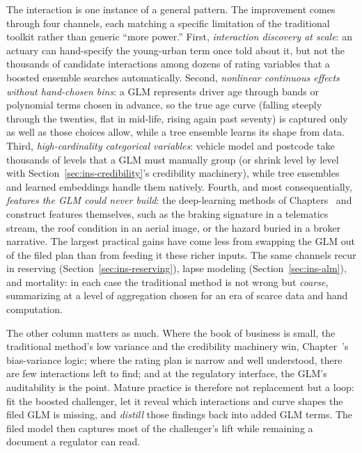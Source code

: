 \documentclass[../ai_in_finance]{subfiles}
\begin{document}
The interaction is one instance of a general pattern. The improvement comes through four channels, each matching a specific limitation of the traditional toolkit rather than generic ``more power.'' First, \emph{interaction discovery at scale}: an actuary can hand-specify the young-urban term once told about it, but not the thousands of candidate interactions among dozens of rating variables that a boosted ensemble searches automatically. Second, \emph{nonlinear continuous effects without hand-chosen bins}: a GLM represents driver age through bands or polynomial terms chosen in advance, so the true age curve (falling steeply through the twenties, flat in mid-life, rising again past seventy) is captured only as well as those choices allow, while a tree ensemble learns its shape from data. Third, \emph{high-cardinality categorical variables}: vehicle model and postcode take thousands of levels that a GLM must manually group (or shrink level by level with Section~\ref{sec:ins-credibility}'s credibility machinery), while tree ensembles and learned embeddings handle them natively. Fourth, and most consequentially, \emph{features the GLM could never build}: the deep-learning methods of Chapters~ and~ construct features themselves, such as the braking signature in a telematics stream, the roof condition in an aerial image, or the hazard buried in a broker narrative. The largest practical gains have come less from swapping the GLM out of the filed plan than from feeding it these richer inputs. The same channels recur in reserving (Section~\ref{sec:ins-reserving}), lapse modeling (Section~\ref{sec:ins-alm}), and mortality: in each case the traditional method is not wrong but \emph{coarse}, summarizing at a level of aggregation chosen for an era of scarce data and hand computation.

The other column matters as much. Where the book of business is small, the traditional method's low variance and the credibility machinery win, Chapter~'s bias-variance logic; where the rating plan is narrow and well understood, there are few interactions left to find; and at the regulatory interface, the GLM's auditability is the point. Mature practice is therefore not replacement but a loop: fit the boosted challenger, let it reveal which interactions and curve shapes the filed GLM is missing, and \emph{distill} those findings back into added GLM terms. The filed model then captures most of the challenger's lift while remaining a document a regulator can read.
\end{document}
